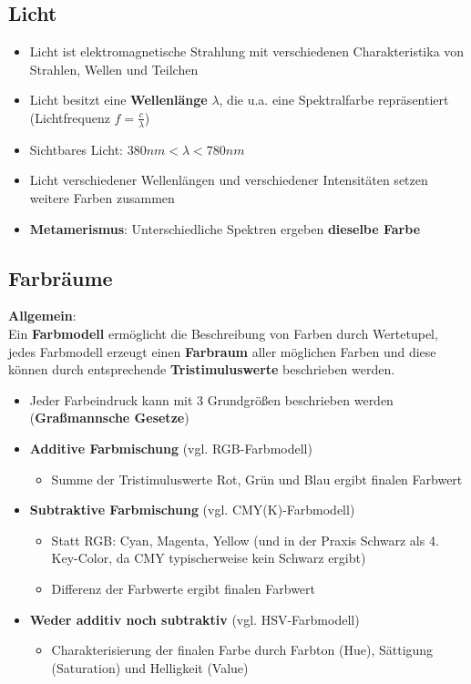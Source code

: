 \subsection{Licht}%
\label{bfp:sub:licht}

\begin{itemize}
	\item Licht ist elektromagnetische Strahlung mit verschiedenen Charakteristika von Strahlen, Wellen und Teilchen
	\item Licht besitzt eine \textbf{Wellenlänge} $\lambda$, die u.a. eine Spektralfarbe repräsentiert\\(Lichtfrequenz $f = \frac{c}{\lambda}$)
	\item Sichtbares Licht: $380nm < \lambda < 780nm$
	\item Licht verschiedener Wellenlängen und verschiedener Intensitäten setzen weitere Farben zusammen
	\item \textbf{Metamerismus}: Unterschiedliche Spektren ergeben \textbf{dieselbe Farbe}
    \end{itemize}

\newpage
\subsection{Farbräume}%
\label{bfp:sub:farbraeume}

\textbf{Allgemein}:\\
Ein \textbf{Farbmodell} ermöglicht die Beschreibung von Farben durch Wertetupel, jedes Farbmodell erzeugt einen \textbf{Farbraum} aller möglichen Farben und diese können durch entsprechende \textbf{Tristimuluswerte} beschrieben werden.

\begin{itemize}
	\item Jeder Farbeindruck kann mit 3 Grundgrößen beschrieben werden (\textbf{Graßmannsche Gesetze})
	\item \textbf{Additive Farbmischung} (vgl. RGB-Farbmodell)
	\begin{itemize}
		\item Summe der Tristimuluswerte Rot, Grün und Blau ergibt finalen Farbwert
	\end{itemize}
	\item \textbf{Subtraktive Farbmischung} (vgl. CMY(K)-Farbmodell)
	\begin{itemize}
		\item Statt RGB: Cyan, Magenta, Yellow (und in der Praxis Schwarz als 4. Key-Color, da CMY typischerweise kein Schwarz ergibt)
		\item Differenz der Farbwerte ergibt finalen Farbwert
	\end{itemize}
	\item \textbf{Weder additiv noch subtraktiv} (vgl. HSV-Farbmodell)
	\begin{itemize}
		\item Charakterisierung der finalen Farbe durch Farbton (Hue), Sättigung (Saturation) und Helligkeit (Value)
	\end{itemize}
\end{itemize}

